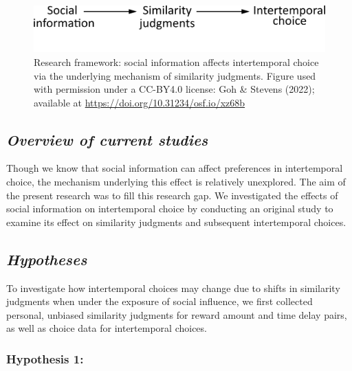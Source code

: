 \documentclass[
  pub,floatsintext]{apa6}
\begin{document}
\begin{figure}

{\centering \includegraphics[width=1\linewidth]{figures/research_framework} 

}

\caption{Research framework: social information affects intertemporal choice via the underlying mechanism of similarity judgments. Figure used with permission under a CC-BY4.0 license: Goh \& Stevens (2022); available at \url{https://doi.org/10.31234/osf.io/xz68b}}\label{fig:researchframework}
\end{figure}

\hypertarget{overview-of-current-studies}{%
\subsection{\texorpdfstring{\emph{Overview of current studies}}{Overview of current studies}}\label{overview-of-current-studies}}

Though we know that social information can affect preferences in intertemporal choice, the mechanism underlying this effect is relatively unexplored. The aim of the present research was to fill this research gap. We investigated the effects of social information on intertemporal choice by conducting an original study to examine its effect on similarity judgments and subsequent intertemporal choices.

\hypertarget{hypotheses}{%
\subsection{\texorpdfstring{\emph{Hypotheses}}{Hypotheses}}\label{hypotheses}}

To investigate how intertemporal choices may change due to shifts in similarity judgments when under the exposure of social influence, we first collected personal, unbiased similarity judgments for reward amount and time delay pairs, as well as choice data for intertemporal choices.

\hypertarget{hypothesis-1}{%
\subsubsection{Hypothesis 1:}\label{hypothesis-1}}
\end{document}
